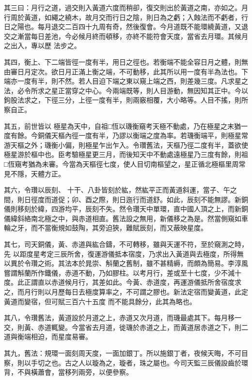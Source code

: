 \begin{pinyinscope}
 其三曰：月行之道，過交則入黃道六度而稍卻，復交則出於黃道之南，亦如之。月行周於黃道，如繩之繞木，故月交而行日之陰，則日為之虧；入蝕法而不虧者，行日之陽也。每月退交二百四十九周有奇，然後復會。今月道既不能環繞黃道，又退交之漸當每日差池，今必候月終而頓移，亦終不能符會天度，當省去月環。其候月之出入，專以歷
 法步之。



 其四，衡上、下二端皆徑一度有半，用日之徑也。若衡端不能全容日月之體，則無由審日月定次。欲日月正滿上衡之端，不可動移，此其所以用一度有半為法也。下端亦一度有半，則不然。若人目迫下端之東以窺上端之西，則差幾三度。凡求星之法，必令所求之星正當穿之中心。今兩端既等，則人目游動，無因知其正中。今以鉤股法求之，下徑三分，上徑一度有半，則兩竅相覆，大小略等。人目不搖，則所察自正。



 其五，前世皆以
 極星為天中，自祖□恆以璣衡窺考天極不動處，乃在極星之末猶一度有餘。今銅儀天樞內徑一度有半，乃謬以衡端之度為率。若璣衡端平，則極星常游天樞之外；璣衡小偏，則極星乍出乍入。令瓚舊法，天樞乃徑二度有半，蓋欲使極星游於樞中也。臣考驗極星更三月，而後知天中不動處遠極星乃三度有餘，則祖□恆窺考猶為未審。今當為天樞徑七度，使人目切南樞望之，星正循北極樞里周常見不隱，天體方正。



 其六，令瓚以辰刻、
 十干、八卦皆刻於紘，然紘平正而黃道斜運，當子、午之間，則日徑度而道促；卯、酉之際，則日迤行而道舒。如此，辰刻不能無謬。新銅儀則移刻於緯，四游均平，辰刻不失。然令瓚天中單環，直中國人頂之上，而新銅儀緯斜絡南北極之中，與赤道相直。舊法設之無用，新儀移之為是。然當側窺如車輪之牙，而不當衡規如鼓陶，其旁迫狹，難賦辰刻，而又蔽映星度。



 其七，司天銅儀，黃、赤道與紘合鑄，不可轉移，雖與天運不符，至於窺測之時，先
 以距度星考定三辰所舍，復運游儀抵本宿度，乃求出入黃道與去極度，所得無以異於令瓚之術。其法本於晁崇、斛蘭之舊制，雖不甚精縟，而頗為簡易。李淳風嘗謂斛蘭所作鐵儀，赤道不動，乃如膠柱。以考月行，差或至十七度，少不減十度。此正謂直以赤道候月行，其差如此。今黃、赤道度，再運游儀抵所舍宿度求之，而月行則以月歷每日去極度算率之，不可謂之膠也。新法定宿而變黃道，此定黃道而變宿，但可賦三百六十五度
 而不能具餘分，此其為略也。



 其八，令瓚舊法，黃道設於月道之上，赤道又次月道，而璣最處其下。每月移一交，則黃、赤道輒變。今當省去月道，徙璣於赤道之上，而黃道居赤道之下，則二道與衡端相迫，而星度易審。



 其九，舊法：規環一面刻周天度，一面加銀丁。所以施銀丁者，夜候天晦，不可目察，則以手切之也。古之人以璇為之，璇者，珠之屬也。今司天監三辰儀設齒於環背，不與橫蕭會，當移列兩旁，以便參察。




\end{pinyinscope}
